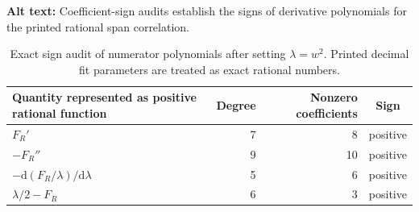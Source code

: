 \begin{table}[ht]
\centering
\caption{Exact sign audit of numerator polynomials after setting $\lambda=w^2$.  Printed decimal fit parameters are treated as exact rational numbers.}
\par\raggedright\textbf{Alt text:} Coefficient-sign audits establish the signs of derivative polynomials for the printed rational span correlation.\par\centering

\label{tab:sign_summary}
\begin{tabular}{lrrc}
\toprule
Quantity represented as positive rational function & Degree & Nonzero coefficients & Sign\\
\midrule
$F_R'$ & 7 & 8 & positive\\
$-F_R''$ & 9 & 10 & positive\\
$-\mathrm d(F_R/\lambda)/\mathrm d\lambda$ & 5 & 6 & positive\\
$\lambda/2-F_R$ & 6 & 3 & positive\\
\bottomrule
\end{tabular}
\end{table}
